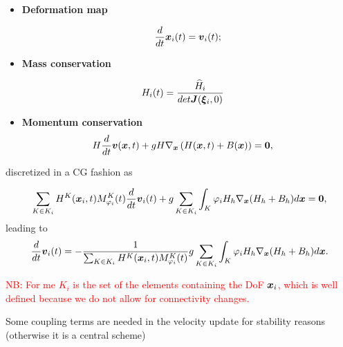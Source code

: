 \documentclass[english]{article}
\theoremstyle{thmstyleone}
\theoremstyle{thmstyletwo}
\theoremstyle{thmstylethree}
\newcommand{\uvec}[2][3]{\boldsymbol{#2\mkern-#1mu}\mkern#1mu}
\begin{document}
\begin{itemize}
\item \textbf{Deformation map}

\begin{equation}
\frac{d}{dt}\uvec{x}_i(t)=\uvec{v}_i(t);
\end{equation}



\item \textbf{Mass conservation}

\begin{align}
&H_i(t)=\frac{\widehat{H}_i}{det \uvec{J}(\uvec{\xi}_i,0)}
\end{align}



\item \textbf{Momentum conservation}
\begin{align}
&H\frac{d}{dt}\uvec{v}(\uvec{x},t)+gH\nabla_{\uvec{x}}\left(H(\uvec{x},t)+B(\uvec{x})\right)=\uvec{0}, \label{eq:momentum_wb_bis}
\end{align}
\end{itemize}

discretized in a CG fashion as

\begin{equation}
\sum_{K \in K_i} H^K(\uvec{x}_i,t) M^K_{\varphi_i}(t)\frac{d}{dt}\uvec{v}_i(t)+g \sum_{K \in K_i} \int_K \varphi_i H_h\nabla_{\uvec{x}}(H_h+B_h)  d\uvec{x}=\uvec{0},
\end{equation}
leading to
\begin{equation}
\frac{d}{dt}\uvec{v}_i(t)=-\frac{1}{\sum_{K \in K_i} H^K(\uvec{x}_i,t) M^K_{\varphi_i}(t)}g \sum_{K \in K_i} \int_K \varphi_i H_h\nabla_{\uvec{x}}(H_h+B_h)  d\uvec{x}.
\end{equation}


\textcolor{red}{
NB: For me $K_i$ is the set of the elements containing the DoF $\uvec{x}_i$, which is well defined because we do not allow for connectivity changes.
}

Some coupling terms are needed in the velocity update for stability reasons (otherwise it is a central scheme)
\end{document}
